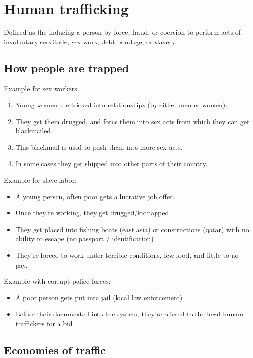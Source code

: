 
\section{Human trafficking} 

Defined as the inducing a person by force, fraud, or coercion to perform acts of involuntary servitude, sex work, debt bondage, or slavery.

\subsection{How people are trapped}

	Example for sex workers:
	\begin{enumerate}
		\item Young women are tricked into relationships (by either men or women).
		\item They get them drugged, and force them into sex acts from which they can get blackmailed.
		\item This blackmail is used to push them into more sex acts.
		\item In some cases they get shipped into other parts of their country.
	\end{enumerate}

	Example for slave labor:
	\begin{itemize}
		\item A young person, often poor gets a lucrative job offer.
		\item Once they're working, they get drugged/kidnapped
		\item They get placed into fishing boats (east asia) or constructions (qatar) with no ability to escape (no passport / identification)
		\item They're forced to work under terrible conditions, few food, and little to no pay.
	\end{itemize}

	Example with corrupt police forces: 
	\begin{itemize}
		\item A poor person gets put into jail (local law enforcement)
		\item Before their documented into the system, they're offered to the local human traffickers for a bid
	\end{itemize}


\subsection{Economies of traffic} 
	

